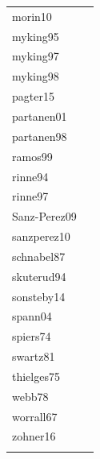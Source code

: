 \documentclass{article}
\begin{document}
\begin{footnotesize}
\begin{longtable}{p{}p{}}
  morin10 & \citep{Morin:2010aa} \\ 
  myking95 & \citep{Myking:1995} \\ 
  myking97 & \citep{Myking:1997aa} \\ 
  myking98 & \citep{Myking:1998aa} \\ 
  pagter15 & \citep{Pagter:2015} \\ 
  partanen01 & \citep{Partanen:2001aa} \\ 
  partanen98 & \citep{Partanen:1998aa} \\ 
  ramos99 & \citep{ramos:1999} \\ 
  rinne94 & \citep{Rinne:1994} \\ 
  rinne97 & \citep{Rinne:1997aa} \\ 
  Sanz-Perez09 & \citep{Sanz-Perez:2009aa} \\ 
  sanzperez10 & \citep{Sanz-Perez:2010aa} \\ 
  schnabel87 & \citep{Schnabel:1987aa} \\ 
  skuterud94 & \citep{Skuterud:1994aa} \\ 
  sonsteby14 & \citep{Sonsteby:2014aa} \\ 
  spann04 & \citep{Spann:2004aa} \\ 
  spiers74 & \citep{Spiers:1974aa} \\ 
  swartz81 & \citep{Swartz:1981aa} \\ 
  thielges75 & \citep{Thielges:1976aa} \\ 
  webb78 & \citep{Webb:1977} \\ 
  worrall67 & \citep{Worrall:1967aa} \\ 
  zohner16 & \citep{zohner2016} \\ 
  \hline
\label{tab:ref}
\end{longtable}
\endgroup


\end{footnotesize}
\end{document}
